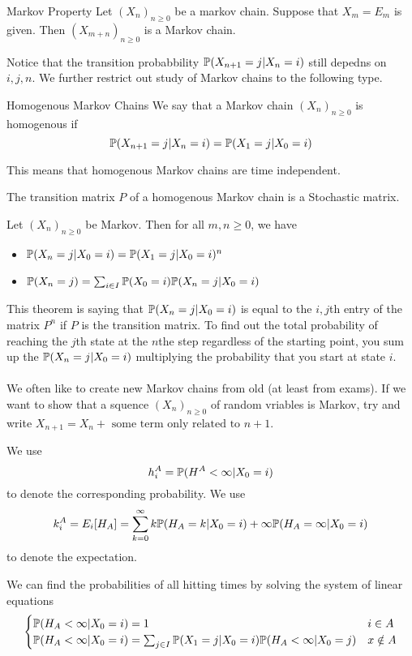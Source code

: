 \documentclass[a4paper]{article}
\begin{document}
\begin{thm}{Markov Property}{} Let $(X_n)_{n\geq0}$ be a markov chain. Suppose that $X_m=E_m$ is given. Then $(X_{m+n})_{n\geq 0}$ is a Markov chain. 
\end{thm}


Notice that the transition probabbility $\mathbb{P}(X_{n+1}=j|X_n=i)$ still depedns on $i,j,n$. We further restrict out study of Markov chains to the following type. 

\begin{defn}{Homogenous Markov Chains}{} We say that a Markov chain $(X_n)_{n\geq 0}$ is homogenous if $$\mathbb{P}(X_{n+1}=j|X_n=i)=\mathbb{P}(X_1=j|X_0=i)$$
\end{defn}

This means that homogenous Markov chains are time independent. 

\begin{lmm}{}{} The transition matrix $P$ of a homogenous Markov chain is a Stochastic matrix. 
\end{lmm}

\begin{thm}{}{} Let $(X_n)_{n\geq 0}$ be Markov. Then for all $m,n\geq0$, we have
\begin{itemize}
\item $\mathbb{P}(X_n=j|X_0=i)=\mathbb{P}(X_1=j|X_0=i)^n$
\item $\mathbb{P}(X_n=j)=\sum_{i\in I}\mathbb{P}(X_0=i)\mathbb{P}(X_n=j|X_0=i)$
\end{itemize}
\end{thm}

This theorem is saying that $\mathbb{P}(X_n=j|X_0=i)$ is equal to the $i,j$th entry of the matrix $P^n$ if $P$ is the transition matrix. To find out the total probability of reaching the $j$th state at the $n$the step regardless of the starting point, you sum up the $\mathbb{P}(X_n=j|X_0=i)$ multiplying the probability that you start at state $i$. \\~\\

We often like to create new Markov chains from old (at least from exams). If we want to show that a squence $(X_n)_{n\geq 0}$ of random vriables is Markov, try and write $X_{n+1}=X_n+\text{ some term only related to }n+1$. 

We use $$h_i^A=\mathbb{P}(H^A<\infty|X_0=i)$$ to denote the corresponding probability. We use $$k_i^A=E_i[H_A]=\sum_{k=0}^\infty k\mathbb{P}(H_A=k|X_0=i)+\infty\mathbb{P}(H_A=\infty|X_0=i)$$ to denote the expectation. 

\begin{prp}{}{} We can find the probabilities of all hitting times by solving the system of linear equations $$\begin{cases}
\mathbb{P}(H_A<\infty|X_0=i)=1 & i\in A\\
\mathbb{P}(H_A<\infty|X_0=i)=\sum_{j\in I}\mathbb{P}(X_1=j|X_0=i)\mathbb{P}(H_A<\infty|X_0=j) & x\notin A
\end{cases}$$
\end{prp}
\end{document}
